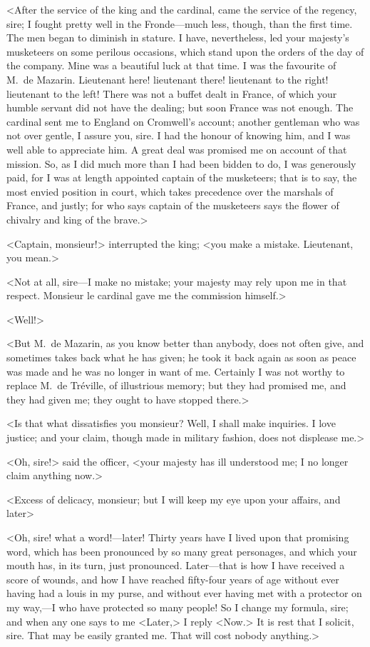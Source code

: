 <After the service of the king and the cardinal, came the service of the regency, sire; I fought pretty well in the Fronde—much less, though, than the first time. The men began to diminish in stature. I have, nevertheless, led your majesty's musketeers on some perilous occasions, which stand upon the orders of the day of the company. Mine was a beautiful luck at that time. I was the favourite of M.~de Mazarin. Lieutenant here! lieutenant there! lieutenant to the right! lieutenant to the left! There was not a buffet dealt in France, of which your humble servant did not have the dealing; but soon France was not enough. The cardinal sent me to England on Cromwell's account; another gentleman who was not over gentle, I assure you, sire. I had the honour of knowing him, and I was well able to appreciate him. A great deal was promised me on account of that mission. So, as I did much more than I had been bidden to do, I was generously paid, for I was at length appointed captain of the musketeers; that is to say, the most envied position in court, which takes precedence over the marshals of France, and justly; for who says captain of the musketeers says the flower of chivalry and king of the brave.>

<Captain, monsieur!> interrupted the king; <you make a mistake. Lieutenant, you mean.>

<Not at all, sire—I make no mistake; your majesty may rely upon me in that respect. Monsieur le cardinal gave me the commission himself.>

<Well!>

<But M.~de Mazarin, as you know better than anybody, does not often give, and sometimes takes back what he has given; he took it back again as soon as peace was made and he was no longer in want of me. Certainly I was not worthy to replace M.~de Tréville, of illustrious memory; but they had promised me, and they had given me; they ought to have stopped there.>

<Is that what dissatisfies you monsieur? Well, I shall make inquiries. I love justice; and your claim, though made in military fashion, does not displease me.>

<Oh, sire!> said the officer, <your majesty has ill understood me; I no longer claim anything now.>

<Excess of delicacy, monsieur; but I will keep my eye upon your affairs, and later\longdash>

<Oh, sire! what a word!—later! Thirty years have I lived upon that promising word, which has been pronounced by so many great personages, and which your mouth has, in its turn, just pronounced. Later—that is how I have received a score of wounds, and how I have reached fifty-four years of age without ever having had a louis in my purse, and without ever having met with a protector on my way,—I who have protected so many people! So I change my formula, sire; and when any one says to me <Later,> I reply <Now.> It is rest that I solicit, sire. That may be easily granted me. That will cost nobody anything.>

